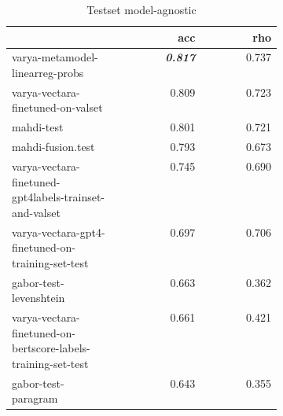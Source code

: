 \begin{table}
\centering
\caption{Testset model-agnostic}
\label{test-agnostic}
\begin{tabular}{|p{0.4\linewidth}|r|r|}
\hline
 & acc & rho \\
\hline
varya-metamodel-linearreg-probs & \textit{\textbf{0.817}} & 0.737 \\
\cline{1-3}
varya-vectara-finetuned-on-valset & 0.809 & 0.723 \\
\cline{1-3}
mahdi-test & 0.801 & 0.721 \\
\cline{1-3}
mahdi-fusion.test & 0.793 & 0.673 \\
\cline{1-3}
varya-vectara-finetuned-gpt4labels-trainset-and-valset & 0.745 & 0.690 \\
\cline{1-3}
varya-vectara-gpt4-finetuned-on-training-set-test & 0.697 & 0.706 \\
\cline{1-3}
gabor-test-levenshtein & 0.663 & 0.362 \\
\cline{1-3}
varya-vectara-finetuned-on-bertscore-labels-training-set-test & 0.661 & 0.421 \\
\cline{1-3}
gabor-test-paragram & 0.643 & 0.355 \\
\cline{1-3}
\hline
\end{tabular}
\end{table}

